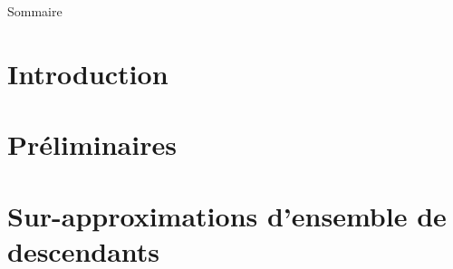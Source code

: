 \documentclass[xcolor={dvipsnames}]{beamer}
\begin{document}
\maketitle

\begin{frame}{Sommaire}
  \small \tableofcontents[hideallsubsections]
\end{frame} 

\section{Introduction}


\section{Préliminaires}


\section{Sur-approximations d'ensemble de descendants}
\end{document}
